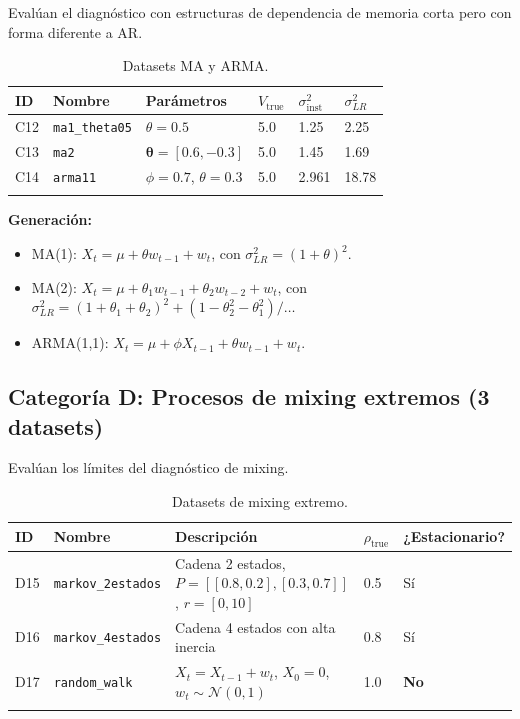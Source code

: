 \documentclass[12pt,a4paper]{article}
\begin{document}
Evalúan el diagnóstico con estructuras de dependencia de memoria corta pero con forma diferente a AR.

\begin{longtable}{@{}llllll@{}}
    \toprule
    ID & Nombre & Parámetros & $V_{\text{true}}$ & $\sigma^2_{\text{inst}}$ & $\sigma^2_{LR}$ \\
    \midrule
    \endhead
    C12 & \texttt{ma1\_theta05} & $\theta = 0.5$ & 5.0 & 1.25 & 2.25 \\
    C13 & \texttt{ma2} & $\boldsymbol{\theta} = [0.6, -0.3]$ & 5.0 & 1.45 & 1.69 \\
    C14 & \texttt{arma11} & $\phi=0.7$, $\theta=0.3$ & 5.0 & 2.961 & 18.78 \\
    \bottomrule
    \caption{Datasets MA y ARMA.}
\end{longtable}

\textbf{Generación:}
\begin{itemize}
    \item MA(1): $X_t = \mu + \theta w_{t-1} + w_t$, con $\sigma^2_{LR} = (1+\theta)^2$.
    \item MA(2): $X_t = \mu + \theta_1 w_{t-1} + \theta_2 w_{t-2} + w_t$, con $\sigma^2_{LR} = (1 + \theta_1 + \theta_2)^2 + (1 - \theta_2^2 - \theta_1^2) / \dots$
    \item ARMA(1,1): $X_t = \mu + \phi X_{t-1} + \theta w_{t-1} + w_t$.
\end{itemize}

\subsection{Categoría D: Procesos de mixing extremos (3 datasets)}

Evalúan los límites del diagnóstico de mixing.

\begin{longtable}{@{}lllll@{}}
    \toprule
    ID & Nombre & Descripción & $\rho_{\text{true}}$ & ¿Estacionario? \\
    \midrule
    \endhead
    D15 & \texttt{markov\_2estados} & Cadena 2 estados, $P = [[0.8,0.2],[0.3,0.7]]$, $r=[0,10]$ & 0.5 & Sí \\
    D16 & \texttt{markov\_4estados} & Cadena 4 estados con alta inercia & 0.8 & Sí \\
    D17 & \texttt{random\_walk} & $X_t = X_{t-1} + w_t$, $X_0=0$, $w_t \sim \mathcal{N}(0,1)$ & 1.0 & \textbf{No} \\
    \bottomrule
    \caption{Datasets de mixing extremo.}
\end{longtable}
\end{document}
